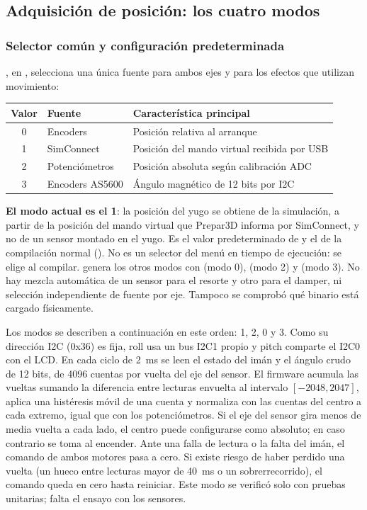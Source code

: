 \subsection{Adquisición de posición: los cuatro modos}
\label{sec:adquisicion_movimiento}
\subsubsection{Selector común y configuración predeterminada}
, en , selecciona una única fuente para ambos ejes y para los efectos que utilizan movimiento:
\begin{center}
\begin{tabular}{cll}
\toprule
Valor & Fuente & Característica principal\\
\midrule
0 & Encoders & Posición relativa al arranque\\
1 & SimConnect & Posición del mando virtual recibida por USB\\
2 & Potenciómetros & Posición absoluta según calibración ADC\\
3 & Encoders AS5600 & Ángulo magnético de 12 bits por I2C\\
\bottomrule
\end{tabular}
\end{center}
\textbf{El modo actual es el 1}: la posición del yugo se obtiene de la simulación, a partir de la posición del mando virtual que Prepar3D informa por SimConnect, y no de un sensor montado en el yugo. Es el valor predeterminado de  y el de la compilación normal (). No es un selector del menú en tiempo de ejecución: se elige al compilar.  genera los otros modos con  (modo 0),  (modo 2) y  (modo 3). No hay mezcla automática de un sensor para el resorte y otro para el damper, ni selección independiente de fuente por eje. Tampoco se comprobó qué binario está cargado físicamente.

Los modos se describen a continuación en este orden: 1, 2, 0 y 3. Como su dirección I2C (0x36) es fija, roll usa un bus I2C1 propio y pitch comparte el I2C0 con el LCD. En cada ciclo de 2~ms se leen el estado del imán y el ángulo crudo de 12 bits, de 4096 cuentas por vuelta del eje del sensor. El firmware acumula las vueltas sumando la diferencia entre lecturas envuelta al intervalo $[-2048,2047]$, aplica una histéresis móvil de una cuenta y normaliza con las cuentas del centro a cada extremo, igual que con los potenciómetros. Si el eje del sensor gira menos de media vuelta a cada lado, el centro puede configurarse como absoluto; en caso contrario se toma al encender. Ante una falla de lectura o la falta del imán, el comando de ambos motores pasa a cero. Si existe riesgo de haber perdido una vuelta (un hueco entre lecturas mayor de 40~ms o un sobrerrecorrido), el comando queda en cero hasta reiniciar. Este modo se verificó solo con pruebas unitarias; falta el ensayo con los sensores.

